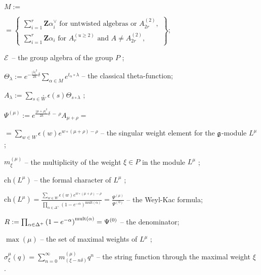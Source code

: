 \documentclass{article}
\begin{document}
$M:=$

\noindent $=\left\{ 
\begin{array}{c}
\sum_{i=1}^{r}\mathbf{Z}\alpha _{i}^{\vee }\text{ for untwisted algebras or }%
A_{2r}^{\left( 2\right) }, \\ 
\sum_{i=1}^{r}\mathbf{Z}\alpha _{i}\text{ for }A_{r}^{\left( u\geq 2\right) }%
\text{ and }A\neq A_{2r}^{\left( 2\right) },
\end{array}
\right\} ;$

$\mathcal{E}$\ -- the group algebra of the group $P$ ;

$\Theta _{\lambda }:=e^{-\frac{\left| \lambda \right| ^{2}}{2k}\delta
}\sum\limits_{\alpha \in M}e^{t_{\alpha }\circ \lambda }$ -- the classical
theta-function;

$A_{\lambda }:=\sum\limits_{s\in \overset{\circ }{W}}\epsilon (s)\Theta
_{s\circ \lambda }$ ;

$\Psi ^{\left( \mu \right) }:=e^{\frac{\left| \mu +\rho \right| ^{2}}{2k}%
\delta \ -\ \rho }A_{\mu +\rho }=$

\noindent $=\sum\limits_{w\in W}\epsilon (w)e^{w\circ(\mu +\rho )-\rho }$ --
the singular weight element for the $\frak{g}$-module $L^{\mu }$;

$m_{\xi }^{\left( \mu \right) }$ -- the multiplicity of the weight $\xi \in
P $ in the module $L^{\mu }$ ;

$\mathrm{ch}\left( L^{\mu }\right) $ -- the formal character of $L^{\mu }$ ;

$\mathrm{ch}\left( L^{\mu }\right) =\frac{\sum_{w\in W}\epsilon (w)e^{w\circ
(\mu +\rho )-\rho }}{\prod_{\alpha \in \Delta ^{+}}\left( 1-e^{-\alpha
}\right) ^{\mathrm{{mult}\left( \alpha \right) }}}=\frac{\Psi ^{\left( \mu
\right) }}{\Psi ^{\left( 0\right) }}$ -- the Weyl-Kac formula;

$R:=\prod_{\alpha \in \Delta ^{+}}\left( 1-e^{-\alpha }\right) ^{\mathrm{{%
mult}\left( \alpha \right) }}=\Psi ^{\left( 0\right) }$ -- the denominator;

$\max (\mu )$ -- the set of maximal weights of $L^{\mu }$ ;

$\sigma _{\xi }^{\mu }\left( q\right) =\sum_{n=0}^{\infty }m_{\left( \xi
-n\delta \right) }^{\left( \mu \right) }q^{n}$ -- the string function
through the maximal weight $\xi $ .
\end{document}
